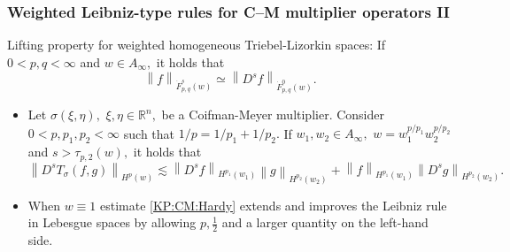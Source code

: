 \documentclass[xcolor=dvipsnames]{beamer}
\newcommand{\rn}{{{\mathbb R}^n}}
\newcommand{\norm}[2]{{\left\| #1 \right\|}_{#2}}
\newcommand{\hcline}{1/p=1/p_1+1/p_2}
\begin{document}
\begin{frame}\frametitle{Weighted Leibniz-type rules for C--M multiplier operators II}

Lifting property for  weighted homogeneous Triebel-Lizorkin spaces: If $0 < p,q < \infty$ and $w\in A_\infty,$ it holds that 
$$\norm{f}{\dot{F}^s_{p,q}(w)}\simeq \norm{D^s f}{\dot{F}^0_{p,q}(w)}.$$




\medskip
\begin{itemize}

\item   Let $\sigma(\xi,\eta),$ $\xi,\eta\in\rn,$ be a Coifman-Meyer multiplier. 
Consider  $0 < p, p_1, p_2  < \infty$  such that $\hcline.$ If  $w_1,w_2\in A_\infty,$  $w=w_1^{{p}/{p_1}} w_2^{{p}/{p_2}}$ and   $s > \tau_{p,2}(w),$ it holds that
\begin{equation*}\label{KP:CM:Hardy}
\norm{D^sT_\sigma(f,g)}{H^p(w)} \lesssim \norm{D^s f}{H^{p_1}(w_1)} \norm{g}{H^{p_2}(w_2)} +  \norm{f}{H^{p_1}(w_1)}   \norm{D^s g}{H^{p_2}(w_2)}.
\end{equation*}


\item When $w \equiv 1$ estimate \ref{KP:CM:Hardy} extends and improves the Leibniz rule in Lebesgue spaces by allowing $p,\frac{1}{2}$ and a larger quantity on the left-hand side.

\end{itemize}
\end{frame}
\end{document}

